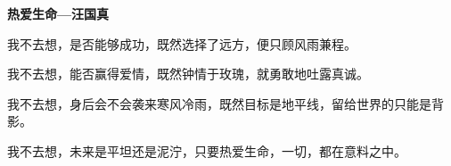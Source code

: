 
\cnabstract
\begin{center} 
  {\sihao\bfseries 热爱生命---汪国真}\\[3pt]
\end{center} 

我不去想，是否能够成功，既然选择了远方，便只顾风雨兼程。

我不去想，能否赢得爱情，既然钟情于玫瑰，就勇敢地吐露真诚。

我不去想，身后会不会袭来寒风冷雨，既然目标是地平线，留给世界的只能是背影。

我不去想，未来是平坦还是泥泞，只要热爱生命，一切，都在意料之中。

